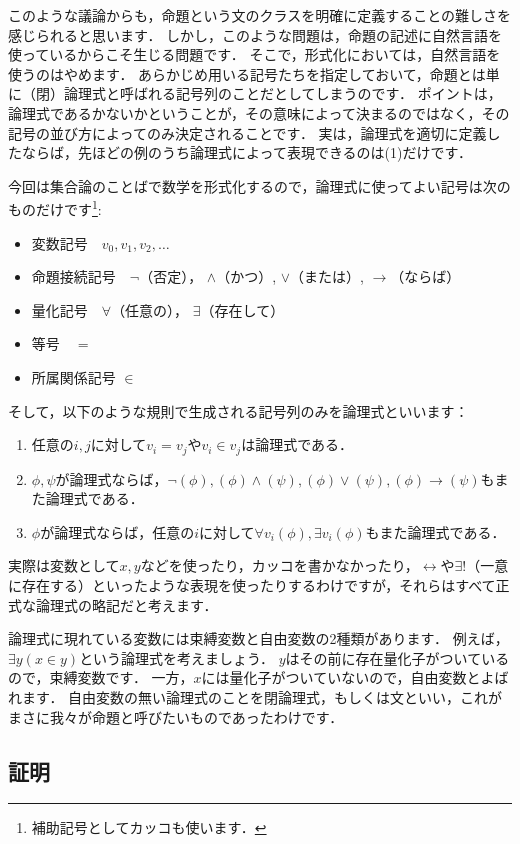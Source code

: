 \documentclass[./main]{subfiles}
\begin{document}
このような議論からも，命題という文のクラスを明確に定義することの難しさを感じられると思います．
しかし，このような問題は，命題の記述に自然言語を使っているからこそ生じる問題です．
そこで，形式化においては，自然言語を使うのはやめます．
あらかじめ用いる記号たちを指定しておいて，命題とは単に（閉）論理式と呼ばれる記号列のことだとしてしまうのです．
ポイントは，論理式であるかないかということが，その意味によって決まるのではなく，その記号の並び方によってのみ決定されることです．
実は，論理式を適切に定義したならば，先ほどの例のうち論理式によって表現できるのは(1)だけです．

今回は集合論のことばで数学を形式化するので，論理式に使ってよい記号は次のものだけです\footnote{補助記号としてカッコも使います．}:
\begin{itemize}
\item 変数記号　$v_{0}, v_{1}, v_{2}, \ldots$
\item 命題接続記号　$\neg$（否定）， $\land$（かつ）, $\lor$（または）, $\to$（ならば）
\item 量化記号　$\forall$（任意の）， $\exists$（存在して）
\item 等号　$=$
\item 所属関係記号 $\in$
\end{itemize}
そして，以下のような規則で生成される記号列のみを論理式といいます：
\begin{enumerate}
\item 任意の$i, j$に対して$v_i = v_j$や$v_i\in v_j$は論理式である．
\item $\phi, \psi$が論理式ならば，$\neg(\phi), (\phi)\land(\psi), (\phi)\lor(\psi), (\phi)\to(\psi)$もまた論理式である．
\item $\phi$が論理式ならば，任意の$i$に対して$\forall v_i(\phi),\exists v_i(\phi)$もまた論理式である．
\end{enumerate}
実際は変数として$x, y$などを使ったり，カッコを書かなかったり，$\leftrightarrow$や$\exists !$（一意に存在する）といったような表現を使ったりするわけですが，それらはすべて正式な論理式の略記だと考えます．

論理式に現れている変数には束縛変数と自由変数の2種類があります．
例えば，$\exists y (x\in y)$という論理式を考えましょう．
$y$はその前に存在量化子がついているので，束縛変数です．
一方，$x$には量化子がついていないので，自由変数とよばれます．
自由変数の無い論理式のことを閉論理式，もしくは文といい，これがまさに我々が命題と呼びたいものであったわけです．

\subsection{証明}
\end{document}
